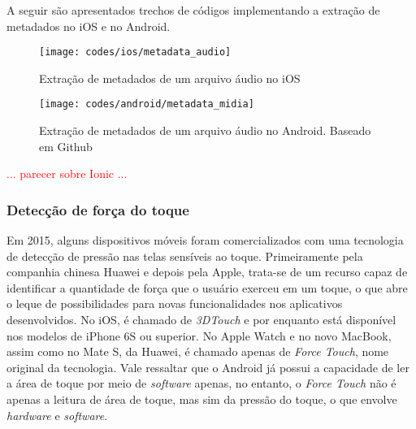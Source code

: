 A seguir são apresentados trechos de códigos implementando a extração de metadados no iOS e no Android.

\begin{figure}[H]
	\centering
	\texttt{[image: codes/ios/metadata\_audio]}
	\caption[Extração de metadados de um arquivo áudio no iOS]{Extração de metadados de um arquivo áudio no iOS}
	\label{fig:metadata_audio-ios}
\end{figure}

\begin{figure}[H]
	\centering
	\texttt{[image: codes/android/metadata\_midia]}
	\caption[Extração de metadados de um arquivo áudio no Android]{Extração de metadados de um arquivo áudio no Android. Baseado em Github\protect\footnotemark}
	\label{fig:metadata_midia-android}
\end{figure}


\textcolor{red}{... parecer sobre Ionic ...}

\subsubsection{Detecção de força do toque} \label{subsubsec:forcetouch}
Em 2015, alguns dispositivos móveis foram comercializados com uma tecnologia de detecção de pressão nas telas sensíveis ao toque. Primeiramente pela companhia chinesa Huawei e depois pela Apple, trata-se de um recurso 
capaz de identificar a quantidade de força que o usuário exerceu em um toque, o que abre o leque de possibilidades para novas funcionalidades nos aplicativos desenvolvidos. 
No iOS, é chamado de \textit{3DTouch} e por enquanto está disponível nos modelos de iPhone 6S ou superior. No Apple Watch e no novo MacBook, assim como no Mate S, da Huawei, é chamado apenas de \textit{Force Touch}, 
nome original da tecnologia. 
Vale ressaltar que o Android já possui a capacidade de ler a área de toque por meio de \textit{software} apenas, no entanto, o \textit{Force Touch} não é apenas a leitura de área de toque, mas sim da pressão do toque,
o que envolve \textit{hardware} e \textit{software}.

